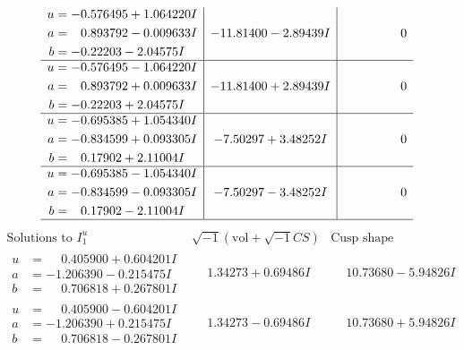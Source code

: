 \documentclass[1p]{elsarticle_modified}
\theoremstyle{definition}
\newcommand{\I}{\sqrt{-1}}
\begin{document}
$$\begin{array}{c|c|c}
\begin{aligned}
u &= -0.576495 + 1.064220 I \\
a &= \phantom{-}0.893792 - 0.009633 I \\
b &= -0.22203 - 2.04575 I\end{aligned}
 & -11.81400 - 2.89439 I & \phantom{-0.000000 } 0 \\ \hline\begin{aligned}
u &= -0.576495 - 1.064220 I \\
a &= \phantom{-}0.893792 + 0.009633 I \\
b &= -0.22203 + 2.04575 I\end{aligned}
 & -11.81400 + 2.89439 I & \phantom{-0.000000 } 0 \\ \hline\begin{aligned}
u &= -0.695385 + 1.054340 I \\
a &= -0.834599 + 0.093305 I \\
b &= \phantom{-}0.17902 + 2.11004 I\end{aligned}
 & -7.50297 + 3.48252 I & \phantom{-0.000000 } 0 \\ \hline\begin{aligned}
u &= -0.695385 - 1.054340 I \\
a &= -0.834599 - 0.093305 I \\
b &= \phantom{-}0.17902 - 2.11004 I\end{aligned}
 & -7.50297 - 3.48252 I & \phantom{-0.000000 } 0\\
 \hline 
 \end{array}$$\newpage$$\begin{array}{c|c|c}  
\text{Solutions to }I^u_{1}& \I (\text{vol} + \sqrt{-1}CS) & \text{Cusp shape}\\
 \hline 
\begin{aligned}
u &= \phantom{-}0.405900 + 0.604201 I \\
a &= -1.206390 - 0.215475 I \\
b &= \phantom{-}0.706818 + 0.267801 I\end{aligned}
 & \phantom{-}1.34273 + 0.69486 I & \phantom{-}10.73680 - 5.94826 I \\ \hline\begin{aligned}
u &= \phantom{-}0.405900 - 0.604201 I \\
a &= -1.206390 + 0.215475 I \\
b &= \phantom{-}0.706818 - 0.267801 I\end{aligned}
 & \phantom{-}1.34273 - 0.69486 I & \phantom{-}10.73680 + 5.94826 I \\ \hline\begin{aligned}

\end{aligned}
\end{array}$$
\end{document}
